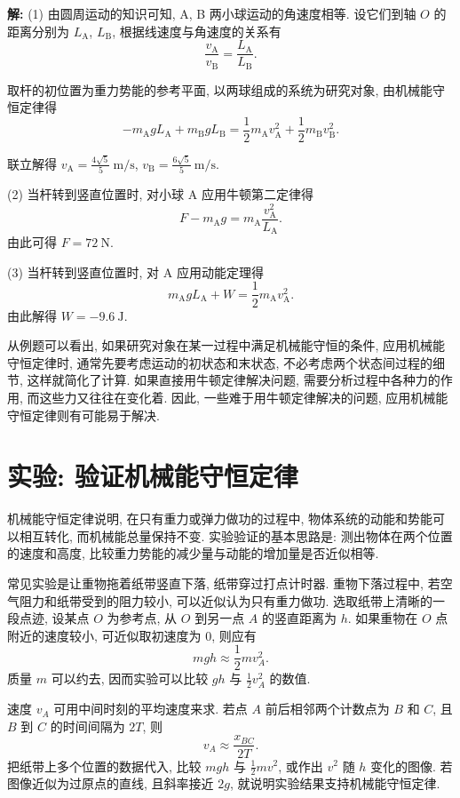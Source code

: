 \documentclass[UTF8,openany,fontset=fandol]{ctexbook}
\theoremstyle{chinesetextbook}
\newenvironment{solution}{\par\indent\textbf{解:} \ignorespaces}{\par}
\newcommand{\unit}[1]{\ \mathrm{#1}}
\begin{document}
\begin{solution}
(1) 由圆周运动的知识可知, A, B 两小球运动的角速度相等. 设它们到轴 $O$ 的距离分别为 $L_\mathrm{A}$, $L_\mathrm{B}$, 根据线速度与角速度的关系有
\[
\frac{v_\mathrm{A}}{v_\mathrm{B}}=\frac{L_\mathrm{A}}{L_\mathrm{B}}.
\]

取杆的初位置为重力势能的参考平面, 以两球组成的系统为研究对象, 由机械能守恒定律得
\[
-m_\mathrm{A}gL_\mathrm{A}+m_\mathrm{B}gL_\mathrm{B}=\frac12 m_\mathrm{A} v_\mathrm{A}^2+\frac12 m_\mathrm{B}v_\mathrm{B}^2.
\]

联立解得 $\displaystyle v_\mathrm{A}=\frac{4\sqrt{5}}{5}\unit{m/s}$, $\displaystyle v_\mathrm{B}=\frac{6\sqrt{5}}{5}\unit{m/s}$.

(2) 当杆转到竖直位置时, 对小球 A 应用牛顿第二定律得
\[
F-m_\mathrm{A}g=m_\mathrm{A}\frac{v_\mathrm{A}^2}{L_\mathrm{A}}.
\]
由此可得 $F=72\unit{N}$.

(3) 当杆转到竖直位置时, 对 A 应用动能定理得
\[
m_\mathrm{A}gL_\mathrm{A}+W=\frac12 m_\mathrm{A}v^2_\mathrm{A}.
\]
由此解得 $W=-9.6\unit{J}$.
\end{solution}
从例题可以看出, 如果研究对象在某一过程中满足机械能守恒的条件, 应用机械能守恒定律时, 通常先要考虑运动的初状态和末状态, 不必考虑两个状态间过程的细节, 这样就简化了计算. 如果直接用牛顿定律解决问题, 需要分析过程中各种力的作用, 而这些力又往往在变化着. 因此, 一些难于用牛顿定律解决的问题, 应用机械能守恒定律则有可能易于解决.
\section{实验: 验证机械能守恒定律}
机械能守恒定律说明, 在只有重力或弹力做功的过程中, 物体系统的动能和势能可以相互转化, 而机械能总量保持不变. 实验验证的基本思路是: 测出物体在两个位置的速度和高度, 比较重力势能的减少量与动能的增加量是否近似相等.

常见实验是让重物拖着纸带竖直下落, 纸带穿过打点计时器. 重物下落过程中, 若空气阻力和纸带受到的阻力较小, 可以近似认为只有重力做功. 选取纸带上清晰的一段点迹, 设某点 $O$ 为参考点, 从 $O$ 到另一点 $A$ 的竖直距离为 $h$. 如果重物在 $O$ 点附近的速度较小, 可近似取初速度为 0, 则应有
\[
mgh\approx\frac12mv_A^2.
\]
质量 $m$ 可以约去, 因而实验可以比较 $gh$ 与 $\displaystyle\frac12v_A^2$ 的数值.

速度 $v_A$ 可用中间时刻的平均速度来求. 若点 $A$ 前后相邻两个计数点为 $B$ 和 $C$, 且 $B$ 到 $C$ 的时间间隔为 $2T$, 则
\[
v_A\approx\frac{x_{BC}}{2T}.
\]
把纸带上多个位置的数据代入, 比较 $mgh$ 与 $\displaystyle\frac12mv^2$, 或作出 $v^2$ 随 $h$ 变化的图像. 若图像近似为过原点的直线, 且斜率接近 $2g$, 就说明实验结果支持机械能守恒定律.
\end{document}
